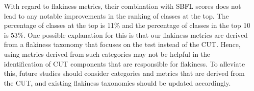 With regard to flakiness metrics, their combination with SBFL scores does not lead to any notable improvements in the ranking of classes at the top. 
The percentage of classes at the top is 11\% and the percentage of classes in the top 10 is 53\%.
One possible explanation for this is that our flakiness metrics are derived from a flakiness taxonomy that focuses on the test instead of the CUT.
Hence, using metrics derived from such categories may not be helpful in the identification of CUT components that are responsible for flakiness.
To alleviate this, future studies should consider categories and metrics that are derived from the CUT, and existing flakiness taxonomies should be updated accordingly.

